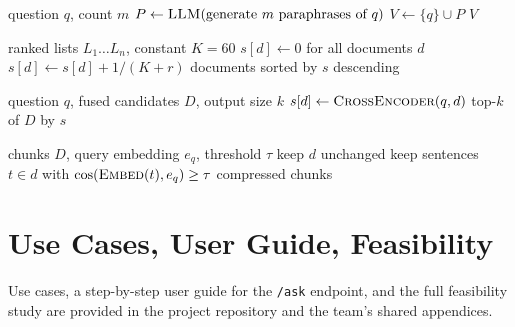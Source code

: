 \documentclass[12pt,a4paper]{report}
\begin{document}
\begin{algorithm}[H]
\caption{Multi-Query (RAG-Fusion) expansion}\label{alg:mq}
\begin{algorithmic}[1]
\Require question $q$, count $m$
\State $P \gets \textsc{LLM}(\text{generate } m \text{ paraphrases of } q)$
\State $V \gets \{q\} \cup P$
\State \Return $V$ 
\end{algorithmic}
\end{algorithm}

\begin{algorithm}[H]
\caption{Reciprocal Rank Fusion (RRF)}\label{alg:rrf}
\begin{algorithmic}[1]
\Require ranked lists $L_1\dots L_n$, constant $K{=}60$
\State $s[d]\gets 0$ for all documents $d$
    \State $s[d] \gets s[d] + 1/(K + r)$
  \EndFor
\EndFor
\State \Return documents sorted by $s$ descending
\end{algorithmic}
\end{algorithm}

\begin{algorithm}[H]
\caption{Cross-encoder re-ranking}\label{alg:rerank}
\begin{algorithmic}[1]
\Require question $q$, fused candidates $D$, output size $k$
 \State $s[d] \gets \textsc{CrossEncoder}(q, d)$ \EndFor
\State \Return top-$k$ of $D$ by $s$
\end{algorithmic}
\end{algorithm}

\begin{algorithm}[H]
\caption{Intent-aware contextual compression}\label{alg:comp}
\begin{algorithmic}[1]
\Require chunks $D$, query embedding $e_q$, threshold $\tau$
   \State keep $d$ unchanged 
  \Else
    \State keep sentences $t\in d$ with $\cos(\textsc{Embed}(t), e_q) \ge \tau$
  \EndIf
\EndFor
\State \Return compressed chunks
\end{algorithmic}
\end{algorithm}

\chapter{Use Cases, User Guide, Feasibility}
Use cases, a step-by-step user guide for the \texttt{/ask} endpoint, and the full
feasibility study are provided in the project repository and the team's shared
appendices.
\end{document}
